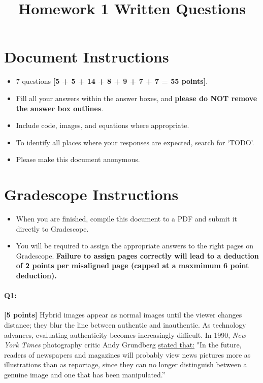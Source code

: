 \date{}

\title{\vspace{-1cm}Homework 1 Written Questions}



\maketitle
\vspace{-3cm}
\thispagestyle{fancy}

\section*{ Document Instructions}
\begin{itemize}
  \item 7 questions \textbf{[5 + 5 + 14 + 8 + 9 + 7 + 7 = 55 points]}.
  \item Fill all your answers within the answer boxes, and \textbf{please do NOT remove the answer box outlines}.
  \item Include code, images, and equations where appropriate.
  \item To identify all places where your responses are expected, search for `TODO'.
  \item Please make this document anonymous.
\end{itemize}

\section*{ Gradescope Instructions}
\begin{itemize}
  \item When you are finished, compile this document to a PDF and submit it directly to Gradescope. 
  \item You will be required to assign the appropriate answers to the right pages on Gradescope. \textbf{Failure to assign pages correctly will lead to a deduction of 2 points per misaligned page (capped at a maxmimum 6 point deduction).}
\end{itemize}
\pagebreak

\paragraph{Q1:} \textbf{[5 points]} Hybrid images appear as normal images until the viewer changes distance; they blur the line between authentic and inauthentic. As technology advances, evaluating authenticity becomes increasingly difficult. In 1990, \emph{New York Times} photography critic Andy Grundberg \href{https://www.nytimes.com/1990/08/12/arts/photography-view-ask-it-no-questions-the-camera-can-lie.html}{stated that:} "In the future, readers of newspapers and magazines will probably view news pictures more as illustrations than as reportage, since they can no longer distinguish between a genuine image and one that has been manipulated.''

